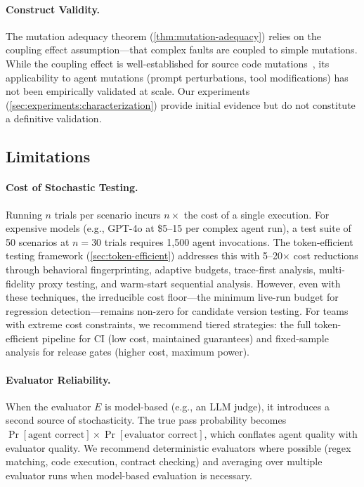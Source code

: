 \paragraph{Construct Validity.}
The mutation adequacy theorem (\cref{thm:mutation-adequacy}) relies on the
coupling effect assumption---that complex faults are coupled to simple
mutations. While the coupling effect is well-established for source code
mutations~\citep{jia2011mutation}, its applicability to agent mutations
(prompt perturbations, tool modifications) has not been empirically
validated at scale. Our experiments (\cref{sec:experiments:characterization}) provide
initial evidence but do not constitute a definitive validation.

\subsection{Limitations}
\label{sec:discussion:limitations}

\paragraph{Cost of Stochastic Testing.}
Running $n$ trials per scenario incurs $n\times$ the cost of a single
execution. For expensive models (e.g., GPT-4o at \$5--15 per complex
agent run), a test suite of 50 scenarios at $n=30$ trials requires 1,500
agent invocations. The token-efficient testing framework
(\cref{sec:token-efficient}) addresses this with 5--20$\times$ cost
reductions through behavioral fingerprinting, adaptive budgets,
trace-first analysis, multi-fidelity proxy testing, and warm-start
sequential analysis. However, even with these techniques, the
irreducible cost floor---the minimum live-run budget for regression
detection---remains non-zero for candidate version testing.
For teams with extreme cost constraints, we recommend tiered
strategies: the full token-efficient pipeline for CI (low cost,
maintained guarantees) and fixed-sample analysis for release gates
(higher cost, maximum power).

\paragraph{Evaluator Reliability.}
When the evaluator $E$ is model-based (e.g., an LLM judge), it
introduces a second source of stochasticity. The true pass probability
becomes $\Pr[\text{agent correct}] \times \Pr[\text{evaluator correct}]$,
which conflates agent quality with evaluator quality. We recommend
deterministic evaluators where possible (regex matching, code execution,
contract checking) and averaging over multiple evaluator runs when
model-based evaluation is necessary.

